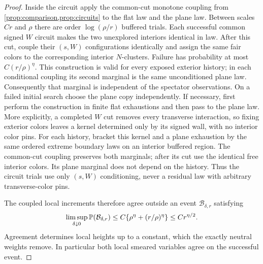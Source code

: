 \begin{proof}
Inside the circuit apply the common-cut monotone coupling from
\cref{prop:comparison,prop:circuits} to the flat law and the plane
law. Between scales $Cr$ and $\rho$ there are order
$\log(\rho/r)$ buffered trials. Each successful common signed
$W$ circuit makes the two unexplored interiors identical in law.
After this cut, couple their $(s,W)$ configurations identically
and assign the same fair colors to the corresponding interior
$N$-clusters. Failure has probability at most $C(r/\rho)^\eta$.
This construction is valid for every exposed exterior history;
in each conditional coupling its second marginal is the same
unconditioned plane law. Consequently that marginal is independent
of the spectator observations. On a failed initial search choose
the plane copy independently. If necessary, first perform the
construction in finite flat exhaustions and then pass to the
plane law.
More explicitly, a completed $W$ cut removes every transverse interaction,
so fixing exterior colors leaves a kernel determined only by its signed
wall, with no interior color pins. For each history, bracket this kernel
and a plane exhaustion by the same ordered extreme boundary laws on an
interior buffered region. The common-cut coupling preserves both marginals;
after its cut use the identical free interior colors. Its plane marginal
does not depend on the history. Thus the circuit trials use only $(s,W)$
conditioning, never a residual law with arbitrary transverse-color pins.

The coupled local increments therefore agree outside an event
$\mathcal B_{\delta,r}$ satisfying
\begin{equation}
 \limsup_{\delta\downarrow0}\P(\mathcal B_{\delta,r})
 \leq C\{\rho^\eta+(r/\rho)^\eta\}
 \leq C r^{\eta/2}.
 \label{eq:local-coupling-error}
\end{equation}
Agreement determines local heights up to a constant, which the
exactly neutral weights remove. In particular both local smeared
variables agree on the successful event.


\end{proof}
